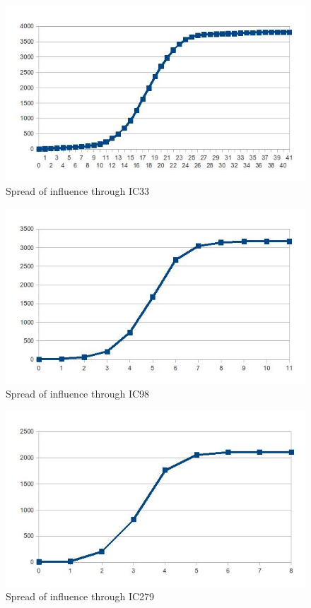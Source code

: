 \begin{figure}[htbp]%
\centering
\includegraphics[]{./img/ic33}%
\caption{Spread of influence through IC33}%
\label{fig:ic33}%
\end{figure}

\begin{figure}[htbp]%
\centering
\includegraphics[]{./img/ic98}%
\caption{Spread of influence through IC98}%
\label{fig:ic98}%
\end{figure}

\begin{figure}[htbp]%
\centering
\includegraphics[]{./img/ic279}%
\caption{Spread of influence through IC279}%
\label{fig:ic10}%
\end{figure}

